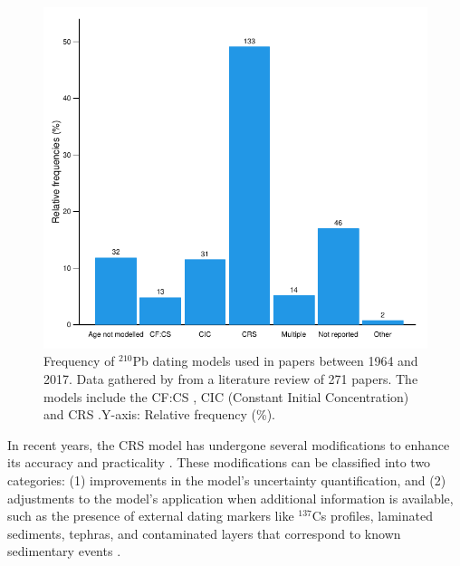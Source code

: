 \documentclass [10pt] {article}
\begin{document}




\begin{figure}[h!]
	\begin{centering}
		\includegraphics[width=.75\linewidth]{barras.pdf}
		\caption{Frequency of $^{210}$Pb dating models used in papers between 1964 and 2017. Data gathered by \citet{Courtney2019} from a literature review of 271 papers. The models include the CF:CS \citep[Constant Flux - Constant Sedimentation;][]{Robbins1978}, CIC (Constant Initial Concentration) \citep{Goldberg1963,Crozaz1964,Robbins1978} and CRS  \citep[Constant Rate of Supply;][]{Appleby1978,Robbins1978}.Y-axis: Relative frequency (\%). }
		\label{fig:210models}
	\end{centering}
\end{figure}

In recent years, the CRS model has undergone several modifications to enhance its accuracy and practicality \citep{Binford1990,Appleby2001,Sanchez-Cabeza2014}. These modifications can be classified into two categories: (1) improvements in the model's uncertainty quantification, and (2) adjustments to the model's application when additional information is available, such as the presence of external dating markers like $^{137}$Cs profiles, laminated sediments, tephras, and contaminated layers that correspond to known sedimentary events \citep{Appleby1998,Appleby2001,Appleby2008}.
\end{document}
